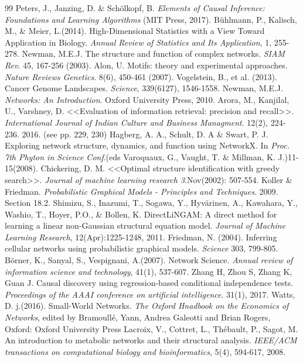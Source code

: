 \documentclass[12pt,a4paper]{report}
\begin{document}
\begin{thebibliography}{99}
Peters, J., Janzing, D. \& Sch\"olkopf, B. \textit{Elements of Causal Inference: Foundations and Learning Algorithms} (MIT Press, 2017).
B\"uhlmann, P., Kalisch, M., \& Meier, L.(2014). High-Dimensional Statistics with a View Toward Application in Biology. \textit{Annual Review of Statistics and Its Application}, 1, 255-278.
Newman, M.E.J. The structure and function of complex networks. \textit{SIAM Rev}. 45, 167-256 (2003).
Alon, U. Motifs: theory and experimental approaches. \textit{Nature Reviews Genetics}. 8(6), 450-461 (2007).
Vogelstein, B., et al. (2013). Cancer Genome Landscapes. \textit{Science}, 339(6127), 1546-1558.
Newman, M.E.J. \textit{Networks: An Introduction}. Oxford University Press, 2010. 
Arora, M., Kanjilal, U., Varshney, D. <<Evaluation of information retrieval: precision and recall>>. \textit{International Journal of Indian Culture and Business Managment}. 12(2), 224-236. 2016. (see pp. 229, 230)
Hagberg, A. A., Schult, D. A \& Swart, P. J. Exploring network structure, dynamics, and function using NetworkX. In \textit{Proc. 7th Phyton in Science Conf}.(eds Varoquaux, G., Vaught, T. \& Millman, K. J.)11-15(2008). 
Chickering, D. M. <<Optimal structure identification with greedy search>>. \textit{Journal of machine learning research 3}.Nov(2002): 507-554.
Koller \& Friedman. \textit{Probabilistic Graphical Models - Principles and Techniques}. 2009. Section 18.2.
Shimizu, S., Inazumi, T., Sogawa, Y., Hyv\:\"arinen, A., Kawahara, Y., Washio, T., Hoyer, P.O., \& Bollen, K. DirectLiNGAM: A direct method for learning a linear non-Gaussian structural equation model. \textit{Journal of Machine Learning Research}, 12(Apr):1225-1248, 2011.
Friedman, N. (2004). Inferring cellular networks using probabilistic graphical models. \textit{Science} 303, 799-805.
B\"orner, K., Sanyal, S., Vespignani, A.(2007). Network Science. \textit{Annual review of information science and technology}, 41(1), 537-607.
Zhang H, Zhou S, Zhang K, Guan J. Causal discovery using regression-based conditional independence tests. \textit{Proceedings of the AAAI conference on artificial intelligence}. 31(1), 2017.
Watts, D. j.(2016). Small-World Networks. \textit{The Oxford Hnadbook on the Economics of Networks}, edited by Bramoullé, Yann, Andrea Galeotti and Brian Rogers, Oxford: Oxford University Press
Lacroix, V., Cottret, L., Thébault, P., Sagot, M. An introduction to metabolic networks and their structural analysis. \textit{IEEE/ACM transactions on computational biology and bioinformatics}, 5(4), 594-617, 2008.

\end{thebibliography}
\end{document}
